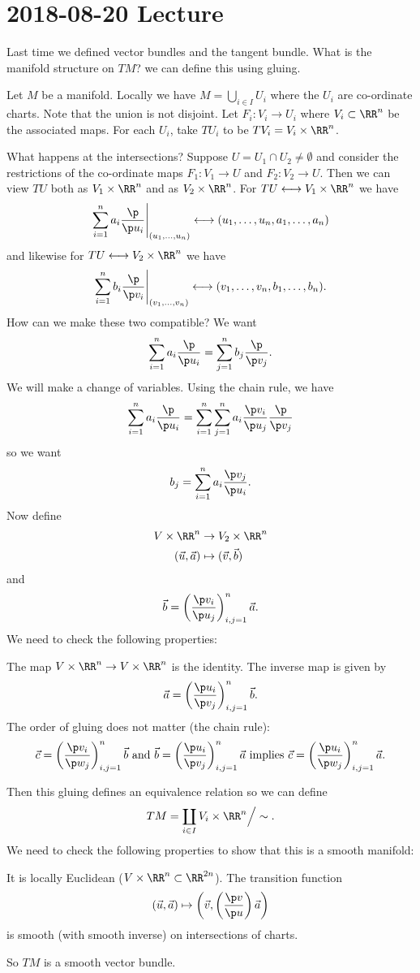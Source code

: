 \section{2018-08-20 Lecture}

Last time we defined vector bundles and the tangent bundle.
What is the manifold structure on $TM$? we can define this using gluing.

Let $M$ be a manifold.
Locally we have $M = \bigcup_{i \in I} U_i$ where the $U_i$ are co-ordinate charts.
Note that the union is not disjoint.
Let $F_i: V_i \to U_i$ where $V_i \subset \RR^n$ be the associated maps.
For each $U_i$, take $TU_i$ to be $TV_i = V_i \times \RR^n$.

What happens at the intersections?
Suppose $U = U_1 \cap U_2 \neq \emptyset$ and consider the restrictions of the co-ordinate maps $F_1: V_1 \to U$ and $F_2: V_2 \to U$.
Then we can view $TU$ both as $V_1 \times \RR^n$ and as $V_2 \times \RR^n$.
For $TU \longleftrightarrow V_1 \times \RR^n$ we have
\[ \sum_{i=1}^n a_i \frac{\p}{\p u_i}\Bigg\vert_{(u_1,\ldots,u_n)} \longleftrightarrow (u_1,\ldots,u_n,a_1,\ldots,a_n) \]
and likewise for $TU \longleftrightarrow V_2 \times \RR^n$ we have
\[ \sum_{i=1}^n b_i \frac{\p}{\p v_i}\Bigg\vert_{(v_1,\ldots,v_n)} \longleftrightarrow (v_1,\ldots,v_n,b_1,\ldots,b_n). \]
How can we make these two compatible?
We want
\[ \sum_{i=1}^n a_i \frac{\p}{\p u_i} = \sum_{j=1}^n b_j \frac{\p}{\p v_j}. \]
We will make a change of variables.
Using the chain rule, we have
\[ \sum_{i=1}^n a_i \frac{\p}{\p u_i} = \sum_{i=1}^n \sum_{j=1}^n a_i \frac{\p v_i}{\p u_j} \frac{\p}{\p v_j} \]
so we want
\[ b_j = \sum_{i=1}^n a_i \frac{\p v_j}{\p u_i}. \]
Now define
\begin{align*}
  V \times \RR^n &\to V_2 \times \RR^n \\
  (\vec u, \vec a) &\mapsto (\vec v, \vec b)
\end{align*}
and
\[ \vec b = \left( \frac{\p v_i}{\p u_j} \right)_{i,j=1}^n \vec a. \]
We need to check the following properties:
\begin{enum}
  \io The map $V \times \RR^n \to V \times \RR^n$ is the identity.
  \io The inverse map is given by
  \[ \vec a = \left( \frac{\p u_i}{\p v_j} \right)_{i,j=1}^n \vec b. \]
  \io The order of gluing does not matter (the chain rule):
  \[ \vec c = \left( \frac{\p v_i}{\p w_j} \right)_{i,j=1}^n \vec b \text{ and } \vec b = \left( \frac{\p u_i}{\p v_j} \right)_{i,j=1}^n \vec a \text{ implies } \vec c = \left( \frac{\p u_i}{\p w_j} \right)_{i,j=1}^n \vec a. \]
\end{enum}
Then this gluing defines an equivalence relation so we can define
\[ TM = \coprod_{i \in I} V_i \times \RR^n \Big/ \sim. \]
We need to check the following properties to show that this is a smooth manifold:
\begin{enum}
  \io It is locally Euclidean ($V \times \RR^n \subset \RR^{2n}$).
  \io The transition function
  \[ (\vec u, \vec a) \mapsto \left( \vec v, \left( \frac{\p v}{\p u} \right) \vec a \right) \]
  is smooth (with smooth inverse) on intersections of charts.
\end{enum}
So $TM$ is a smooth vector bundle.

